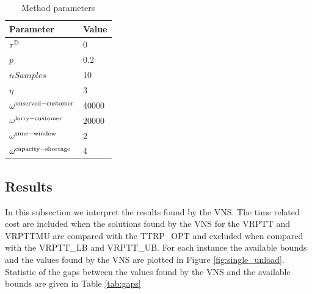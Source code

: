 \begin{table}[ht]
\centering
\caption{Method parameters}
\label{tab:parameters}
\begin{tabular}{ll}
\toprule
Parameter       & Value       \\ \midrule
%
$\tau^{\rm D}$ & 0 \\
$p$   & 0.2    \\
$nSamples $ & 10 \\
$\eta$ & 3 \\
$\omega^{\rm unserved-customer}$ & 40000 \\
$\omega^{\rm lorry-customer}$    & 20000 \\
$\omega^{\rm time-window}$       & 2 \\
$\omega^{\rm capacity-shortage}$ & 4 \\
%
\bottomrule
\end{tabular}
\end{table}

\subsection{Results}


In this subsection we interpret the results found by the VNS.
The time related cost are included when the solutions found by the VNS for the VRPTT and VRPTTMU are compared with the TTRP\_OPT and excluded when compared with the VRPTT\_LB and VRPTT\_UB.
 For each instance the available bounds and the values found by the VNS are plotted in Figure \ref{fig:single_unload}.
Statistic of the gaps between the values found by the VNS and the available bounds are given in Table \ref{tab:gaps}

